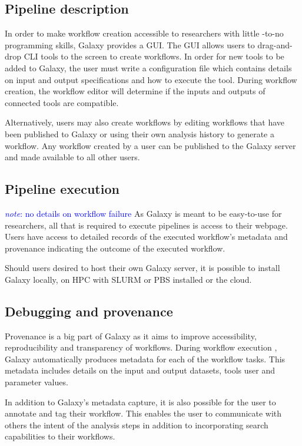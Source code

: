 \documentclass{report}
\newcommand{\note}[1]{\textcolor{blue}{\textit{note}: #1}}
\begin{document}
        \subsection{Pipeline description}
        In order to make workflow creation accessible to researchers with little
        -to-no programming skills, Galaxy provides a GUI. 
        The GUI allows users to drag-and-drop CLI tools to the screen to create
        workflows. In order for new tools to be added to Galaxy, the user must 
        write a configuration file which contains details on input and output
        specifications and how to execute the tool. During workflow creation, 
        the workflow editor will determine if the inputs and outputs of 
        connected tools are compatible. 

        Alternatively, users may also create workflows by editing workflows that
        have been published to Galaxy or using their own analysis history to 
        generate a workflow. Any workflow created by a user can be published to
        the Galaxy server and made available to all other users.

        \subsection{Pipeline execution}

        \note{no details on workflow failure}
        As Galaxy is meant to be easy-to-use for researchers, all that is 
        required to execute pipelines is access to their webpage. Users have 
        access to detailed records of the executed workflow's metadata and 
        provenance indicating the outcome of the executed workflow.

        Should users desired to host their own Galaxy server, it is possible to
        install Galaxy locally, on HPC with SLURM or PBS installed or the cloud.

        \subsection{Debugging and provenance} 
        Provenance is a big part of Galaxy as it aims to improve accessibility, 
        reproducibility and transparency of workflows. During workflow execution
        , Galaxy automatically produces metadata for each of the workflow tasks.
        This metadata includes details on the input and output datasets, tools 
        user and parameter values.

        In addition to Galaxy's metadata capture, it is also possible for the 
        user to annotate and tag their workflow. This enables the user to 
        communicate with others the intent of the analysis steps in addition to 
        incorporating search capabilities to their workflows.
\end{document}
